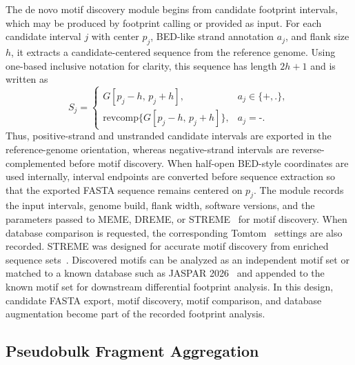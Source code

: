 \documentclass[biomedinformatics,article,submit,pdftex,moreauthors]{Definitions/mdpi}
\begin{document}
The de novo motif discovery module begins from candidate footprint intervals,
which may be produced by footprint calling or provided as input. For each
candidate interval $j$ with center $p_j$, BED-like strand annotation $a_j$, and
flank size $h$, it extracts a candidate-centered sequence from the reference
genome. Using one-based inclusive notation for clarity, this sequence has length
$2h+1$ and is written as
\[
S_j =
\begin{cases}
G[p_j-h,\,p_j+h], & a_j \in \{\texttt{+}, \texttt{.}\},\\
\mathrm{revcomp}\{G[p_j-h,\,p_j+h]\}, & a_j = \texttt{-}.
\end{cases}
\]
Thus, positive-strand and unstranded candidate intervals are exported in the
reference-genome orientation, whereas negative-strand intervals are
reverse-complemented before motif discovery.
When half-open BED-style coordinates are used internally, interval endpoints are
converted before sequence extraction so that the exported FASTA sequence remains
centered on $p_j$. The module records the input intervals, genome build, flank
width, software versions, and the parameters passed to MEME, DREME, or
STREME~\cite{bailey2015meme,Bailey2011_DREME,Bailey2021_STREME} for motif
discovery. When database comparison is requested, the corresponding
Tomtom~\cite{gupta2007tomtom} settings are also recorded. STREME was designed
for accurate motif discovery from enriched sequence sets~\cite{Bailey2021_STREME}.
Discovered motifs can be analyzed as an independent motif set or matched to a
known database such as JASPAR 2026~\cite{jaspar2026} and appended to the known
motif set for downstream differential footprint analysis. In this design,
candidate FASTA export, motif discovery, motif comparison, and database
augmentation become part of the recorded footprint analysis.

\subsection{Pseudobulk Fragment Aggregation}
\end{document}
